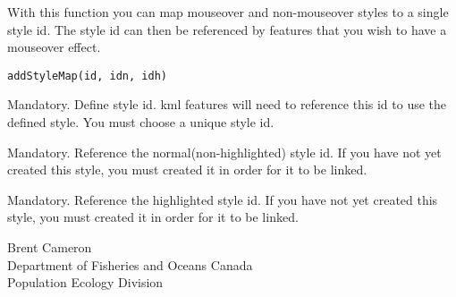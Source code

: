 \documentclass[a4paper]{book}
\begin{document}
%
\begin{Description}\relax
With this function you can map mouseover and non-mouseover styles to a single style id. The style id can then be referenced by features that you wish to have a mouseover effect. 
\end{Description}
%
\begin{Usage}
\begin{verbatim}
addStyleMap(id, idn, idh)
\end{verbatim}
\end{Usage}
%
\begin{Arguments}
\begin{ldescription}
\item[\code{id}] 
Mandatory. Define style id. kml features will need to reference this id to use the defined style. You must choose a unique style id.
  
\item[\code{idn}] Mandatory. Reference the normal(non-highlighted) style id. If you have not yet created this style, you must created it in order for it to be linked. 
\item[\code{idh}] Mandatory. Reference the highlighted style id. If you have not yet created this style, you must created it in order for it to be linked. 
\end{ldescription}
\end{Arguments}
%
\begin{Author}\relax
Brent Cameron\\{}
Department of Fisheries and Oceans Canada\\{}
Population Ecology Division
\end{Author}
%
\begin{References}\relax
{}
\end{References}
%
\end{document}

